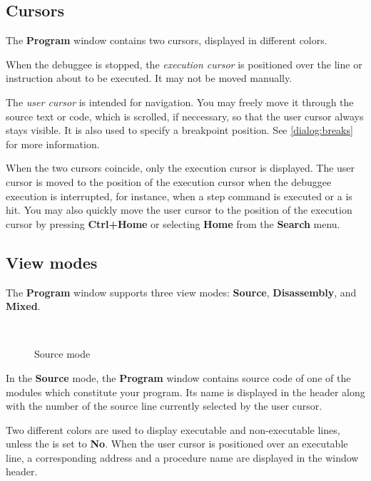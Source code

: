 \subsection{Cursors}
\label{dialog:navigating:cursors}

The {\bf Program} window contains two cursors, displayed in different colors.

When the debuggee is stopped, the {\it execution cursor} is positioned
over the line or instruction about to be executed. It may not be moved manually.

The {\it user cursor} is intended for navigation. You may freely move it
through the source text or code, which is scrolled, if neccessary,
so that the user cursor always stays visible. It is also used to specify a
breakpoint position. See \ref{dialog:breaks} for more information.

When the two cursors coincide, only the execution cursor is displayed.
The user cursor is moved to the position of the execution cursor
when the debuggee execution is interrupted, for instance, when
a step command is executed or a  is hit.
You may also quickly move the user cursor to the position of the execution
cursor by pressing {\bf Ctrl+Home} or selecting {\bf Home} from the
{\bf Search} menu.

\subsection{View modes}
\label{dialog:navigating:modes}

The {\bf Program} window supports three view modes: {\bf Source}, {\bf Disassembly},
and {\bf Mixed}.

\ifcomment
\begin{figure}[htb]
\begin{center} \ \ \end{center}
\caption{Source mode}
\end{figure}
\fi

In the {\bf Source} mode, the {\bf Program} window contains source code of
one of the modules which constitute your program. Its name is
displayed in the header along with the number of the source line
currently selected by the user cursor.

Two different colors are used to display executable
and non-executable lines, unless the
is set to {\bf No}. When the user cursor is positioned
over an executable line, a corresponding address and a
procedure name are displayed in the window header.

